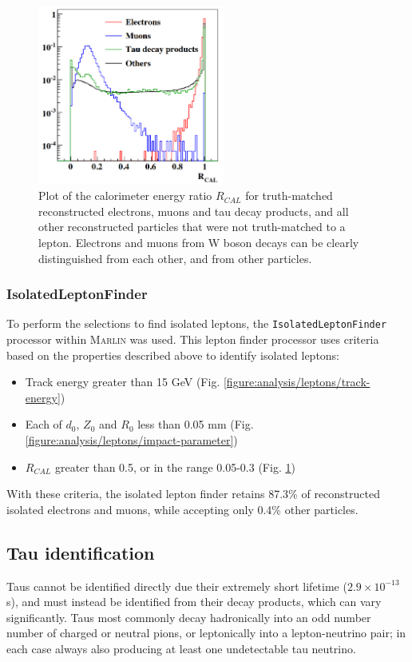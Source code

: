\begin{figure}[p]
	\centering
	\includegraphics[width=0.55\textwidth]{../Pictures/Analysis/cal-energy.png}
	\caption{Plot of the calorimeter energy ratio $R_{CAL}$ for truth-matched reconstructed electrons, muons and tau decay products, and all other reconstructed particles that were not truth-matched to a lepton. Electrons and muons from W boson decays can be clearly distinguished from each other, and from  other particles.}
	\label{figure:analysis/leptons/cal-energy}
\end{figure}

\subsubsection{IsolatedLeptonFinder}
To perform the selections to find isolated leptons, the \texttt{IsolatedLeptonFinder} processor within \textsc{Marlin} was used. This lepton finder processor uses criteria based on the properties described above to identify isolated leptons:

\begin{itemize}
	\item Track energy greater than 15 GeV (Fig. \ref{figure:analysis/leptons/track-energy})
	\item Each of $d_0$, $Z_0$ and $R_0$ less than 0.05 mm (Fig. \ref{figure:analysis/leptons/impact-parameter})
	\item $R_{CAL}$ greater than 0.5, or in the range 0.05-0.3 (Fig. \ref{figure:analysis/leptons/cal-energy})
\end{itemize}

With these criteria, the isolated lepton finder retains 87.3\% of reconstructed isolated electrons and muons, while accepting only 0.4\% other particles.

\subsection{Tau identification}
Taus cannot be identified directly due their extremely short lifetime ($2.9 \times 10^{-13}$s), and must instead be identified from their decay products, which can vary significantly. Taus most commonly decay hadronically into an odd number number of charged or neutral pions, or leptonically into a lepton-neutrino pair; in each case always also producing at least one undetectable tau neutrino. 

